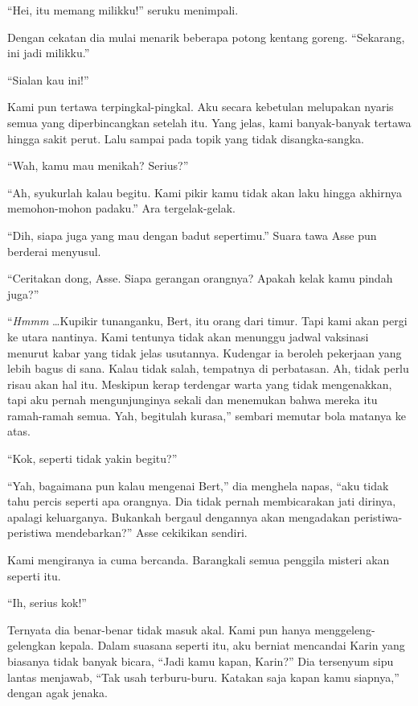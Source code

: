 \documentclass[smalldemyvopaper,11pt,twoside,onecolumn,openright,extrafontsizes]{memoir}
\begin{document}
``Hei, itu memang milikku!'' seruku menimpali.

Dengan cekatan dia mulai menarik beberapa potong kentang goreng. ``Sekarang, ini jadi milikku.''

``Sialan kau ini!''

Kami pun tertawa terpingkal-pingkal. Aku secara kebetulan melupakan nyaris semua yang diperbincangkan setelah itu. Yang jelas, kami banyak-banyak tertawa hingga sakit perut. Lalu sampai pada topik yang tidak disangka-sangka.

``Wah, kamu mau menikah? Serius?''

``Ah, syukurlah kalau begitu. Kami pikir kamu tidak akan laku hingga akhirnya memohon-mohon padaku.'' Ara tergelak-gelak.

``Dih, siapa juga yang mau dengan badut sepertimu.'' Suara tawa Asse pun berderai menyusul.


``Ceritakan dong, Asse. Siapa gerangan orangnya? Apakah kelak kamu pindah juga?''


``\textit{Hmmm} \dots Kupikir tunanganku, Bert, itu orang dari timur. Tapi kami akan pergi ke utara nantinya. Kami tentunya tidak akan menunggu jadwal vaksinasi menurut kabar yang tidak jelas usutannya. Kudengar ia beroleh pekerjaan yang lebih bagus di sana. Kalau tidak salah, tempatnya di perbatasan. Ah, tidak perlu risau akan hal itu. Meskipun kerap terdengar warta yang tidak mengenakkan, tapi aku pernah mengunjunginya sekali dan menemukan bahwa mereka itu ramah-ramah semua. Yah, begitulah kurasa,'' sembari memutar bola matanya ke atas.

``Kok, seperti tidak yakin begitu?''


``Yah, bagaimana pun kalau mengenai Bert,'' dia menghela napas, ``aku tidak tahu percis seperti apa orangnya. Dia tidak pernah membicarakan jati dirinya, apalagi keluarganya. Bukankah bergaul dengannya akan mengadakan peristiwa-peristiwa mendebarkan?'' Asse cekikikan sendiri.

Kami mengiranya ia cuma bercanda. Barangkali semua penggila misteri akan seperti itu.

``Ih, serius kok!''


Ternyata dia benar-benar tidak masuk akal. Kami pun hanya menggeleng-gelengkan kepala. Dalam suasana seperti itu, aku berniat mencandai Karin yang biasanya tidak banyak bicara, ``Jadi kamu kapan, Karin?'' Dia tersenyum sipu lantas menjawab, ``Tak usah terburu-buru. Katakan saja kapan kamu siapnya,'' dengan agak jenaka.
\end{document}
